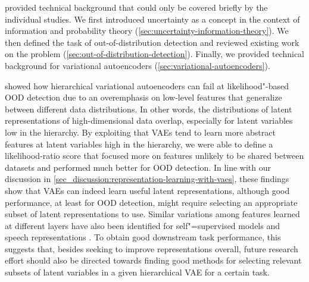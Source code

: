 

\vspace{1em}
\textbf{} provided technical background that could only be covered briefly by the individual studies. 
We first introduced uncertainty as a concept in the context of information and probability theory (\cref{sec:uncertainty-information-theory}). We then defined the task of out-of-distribution detection and reviewed existing work on the problem (\cref{sec:out-of-distribution-detection}). Finally, we provided technical background for variational autoencoders (\cref{sec:variational-autoencoders}).

\vspace{1em}
\textbf{} showed how hierarchical variational autoencoders can fail at likelihood"-based OOD detection due to an overemphasis on low-level features that generalize between different data distributions. 
In other words, the distributions of latent representations of high-dimensional data overlap, especially for latent variables low in the hierarchy.
By exploiting that VAEs tend to learn more abstract features at latent variables high in the hierarchy, we were able to define a likelihood-ratio score that focused more on features unlikely to be shared between datasets and performed much better for OOD detection. 
In line with our discussion in \cref{sec_discussion:representation-learning-with-vaes}, these findings show that VAEs can indeed learn useful latent representations, although good performance, at least for OOD detection, might require selecting an appropriate subset of latent representations to use. 
Similar variations among features learned at different layers have also been identified for self"=supervised models and speech representations \parencite{pasad_layerwise_2021}. 
To obtain good downstream task performance, this suggests that, besides seeking to improve representations overall, future research effort should also be directed towards finding good methods for selecting relevant subsets of latent variables in a given hierarchical VAE for a certain task.

